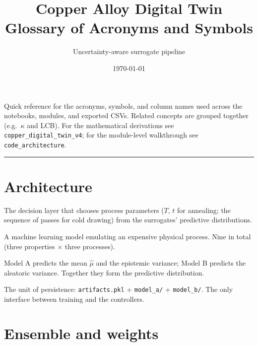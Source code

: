 \documentclass[11pt,a4paper]{article}
\title{\textbf{Copper Alloy Digital Twin}\\[0.3em]
\large Glossary of Acronyms and Symbols}
\author{Uncertainty-aware surrogate pipeline}
\date{\today}
\newcommand{\code}[1]{\texttt{\small #1}}
\newenvironment{terms}
  {\begin{description}[style=unboxed,leftmargin=1.2em,itemsep=0.45em,parsep=0pt,
                       font=\normalfont\bfseries]}
  {\end{description}}
\begin{document}
\maketitle

\noindent
Quick reference for the acronyms, symbols, and column names used across the
notebooks, modules, and exported CSVs. Related concepts are grouped together
(e.g.\ $\kappa$ and LCB). For the mathematical derivations see
\code{copper\_digital\_twin\_v4}; for the module-level walkthrough see
\code{code\_architecture}.

\vspace{0.5em}
\hrule

\section{Architecture}

\begin{terms}
  \item[MBC --- Model-Based Controller] The decision layer that chooses process
    parameters ($T$, $t$ for annealing; the sequence of passes for cold
    drawing) from the surrogates' predictive distributions.

  \item[Surrogate] A machine learning model emulating an expensive physical
    process. Nine in total (three properties $\times$ three processes).

  \item[Model A / Model B] Model A predicts the mean $\hat\mu$ and the
    epistemic variance; Model B predicts the aleatoric variance. Together they
    form the predictive distribution.

  \item[Bundle] The unit of persistence: \code{artifacts.pkl} $+$
    \code{model\_a/} $+$ \code{model\_b/}. The only interface between training
    and the controllers.
\end{terms}

\section{Ensemble and weights}
\end{document}
